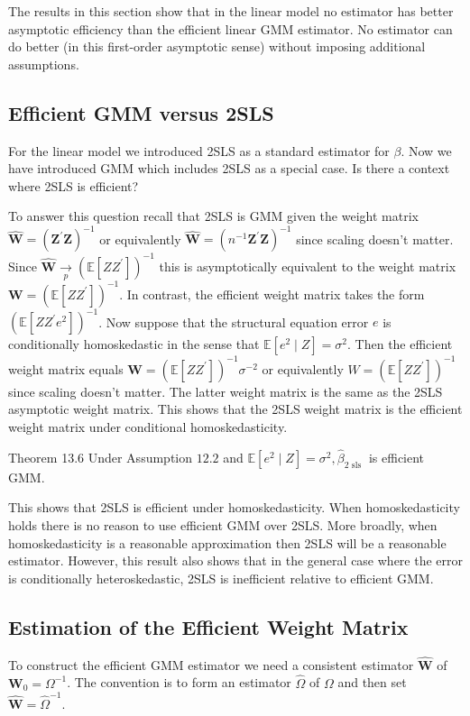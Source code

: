 \documentclass[10pt]{article}
\begin{document}
The results in this section show that in the linear model no estimator has better asymptotic efficiency than the efficient linear GMM estimator. No estimator can do better (in this first-order asymptotic sense) without imposing additional assumptions.

\subsection{Efficient GMM versus 2SLS}
For the linear model we introduced 2SLS as a standard estimator for $\beta$. Now we have introduced GMM which includes 2SLS as a special case. Is there a context where 2SLS is efficient?

To answer this question recall that 2SLS is GMM given the weight matrix $\widehat{\boldsymbol{W}}=\left(\boldsymbol{Z}^{\prime} \boldsymbol{Z}\right)^{-1}$ or equivalently $\widehat{\boldsymbol{W}}=\left(n^{-1} \boldsymbol{Z}^{\prime} \boldsymbol{Z}\right)^{-1}$ since scaling doesn't matter. Since $\widehat{\boldsymbol{W}} \underset{p}{\longrightarrow}\left(\mathbb{E}\left[Z Z^{\prime}\right]\right)^{-1}$ this is asymptotically equivalent to the weight matrix $\boldsymbol{W}=\left(\mathbb{E}\left[Z Z^{\prime}\right]\right)^{-1}$. In contrast, the efficient weight matrix takes the form $\left(\mathbb{E}\left[Z Z^{\prime} e^{2}\right]\right)^{-1}$. Now suppose that the structural equation error $e$ is conditionally homoskedastic in the sense that $\mathbb{E}\left[e^{2} \mid Z\right]=\sigma^{2}$. Then the efficient weight matrix equals $\boldsymbol{W}=\left(\mathbb{E}\left[Z Z^{\prime}\right]\right)^{-1} \sigma^{-2}$ or equivalently $W=\left(\mathbb{E}\left[Z Z^{\prime}\right]\right)^{-1}$ since scaling doesn't matter. The latter weight matrix is the same as the 2SLS asymptotic weight matrix. This shows that the 2SLS weight matrix is the efficient weight matrix under conditional homoskedasticity.

Theorem 13.6 Under Assumption $12.2$ and $\mathbb{E}\left[e^{2} \mid Z\right]=\sigma^{2}, \widehat{\beta}_{2 \text { sls }}$ is efficient GMM.

This shows that 2SLS is efficient under homoskedasticity. When homoskedasticity holds there is no reason to use efficient GMM over 2SLS. More broadly, when homoskedasticity is a reasonable approximation then 2SLS will be a reasonable estimator. However, this result also shows that in the general case where the error is conditionally heteroskedastic, 2SLS is inefficient relative to efficient GMM.

\subsection{Estimation of the Efficient Weight Matrix}
To construct the efficient GMM estimator we need a consistent estimator $\widehat{\boldsymbol{W}}$ of $\boldsymbol{W}_{0}=\Omega^{-1}$. The convention is to form an estimator $\widehat{\Omega}$ of $\Omega$ and then set $\widehat{\boldsymbol{W}}=\widehat{\Omega}^{-1}$.
\end{document}
